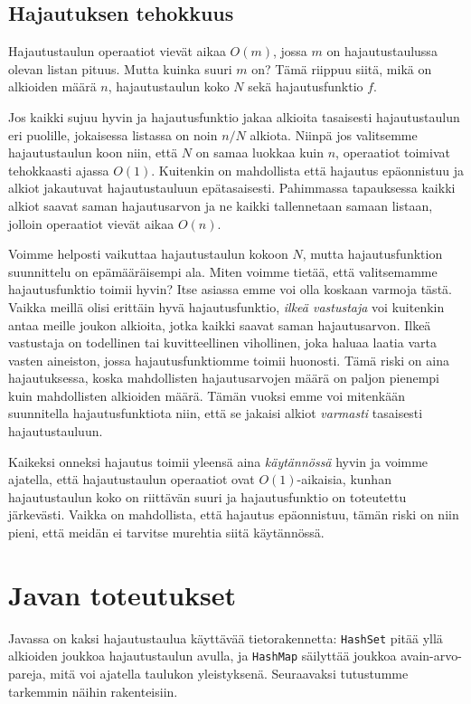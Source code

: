 \subsection{Hajautuksen tehokkuus}

Hajautustaulun operaatiot vievät aikaa $O(m)$,
jossa $m$ on hajautustaulussa olevan listan pituus.
Mutta kuinka suuri $m$ on? Tämä riippuu siitä,
mikä on alkioiden määrä $n$, hajautustaulun koko $N$
sekä hajautusfunktio $f$.

Jos kaikki sujuu hyvin ja hajautusfunktio jakaa alkioita
tasaisesti hajautustaulun eri puolille,
jokaisessa listassa on noin $n/N$ alkiota.
Niinpä jos valitsemme hajautustaulun koon niin,
että $N$ on samaa luokkaa kuin $n$,
operaatiot toimivat tehokkaasti ajassa $O(1)$.
Kuitenkin on mahdollista että hajautus epäonnistuu
ja alkiot jakautuvat hajautustauluun epätasaisesti.
Pahimmassa tapauksessa kaikki alkiot saavat saman
hajautusarvon ja ne kaikki tallennetaan samaan listaan,
jolloin operaatiot vievät aikaa $O(n)$.

Voimme helposti vaikuttaa hajautustaulun kokoon $N$,
mutta hajautusfunktion suunnittelu on epämääräisempi ala.
Miten voimme tietää, että valitsemamme hajautusfunktio
toimii hyvin?
Itse asiassa emme voi olla koskaan varmoja tästä.
Vaikka meillä olisi erittäin hyvä hajautusfunktio,
\emph{ilkeä vastustaja} voi kuitenkin antaa
meille joukon alkioita, jotka kaikki saavat saman hajautusarvon.
Ilkeä vastustaja on todellinen tai kuvitteellinen vihollinen,
joka haluaa laatia varta vasten aineiston,
jossa hajautusfunktiomme toimii huonosti.
Tämä riski on aina hajautuksessa, koska mahdollisten
hajautusarvojen määrä on paljon pienempi kuin mahdollisten alkioiden määrä.
Tämän vuoksi emme voi mitenkään suunnitella hajautusfunktiota niin,
että se jakaisi alkiot \emph{varmasti} tasaisesti hajautustauluun.

Kaikeksi onneksi hajautus toimii yleensä aina \emph{käytännössä}
hyvin ja voimme ajatella, että hajautustaulun operaatiot ovat
$O(1)$-aikaisia, kunhan hajautustaulun koko on riittävän suuri ja
hajautusfunktio on toteutettu järke\-västi.
Vaikka on mahdollista, että hajautus epäonnistuu,
tämän riski on niin pieni, että meidän ei tarvitse murehtia
siitä käytännössä.

\section{Javan toteutukset}

Javassa on kaksi hajautustaulua käyttävää tietorakennetta:
\texttt{HashSet} pitää yllä alkioiden joukkoa
hajautustaulun avulla, ja \texttt{HashMap} säilyttää
joukkoa avain-arvo-pareja, mitä voi ajatella taulukon yleistyksenä.
Seuraavaksi tutustumme tarkemmin näihin rakenteisiin.

